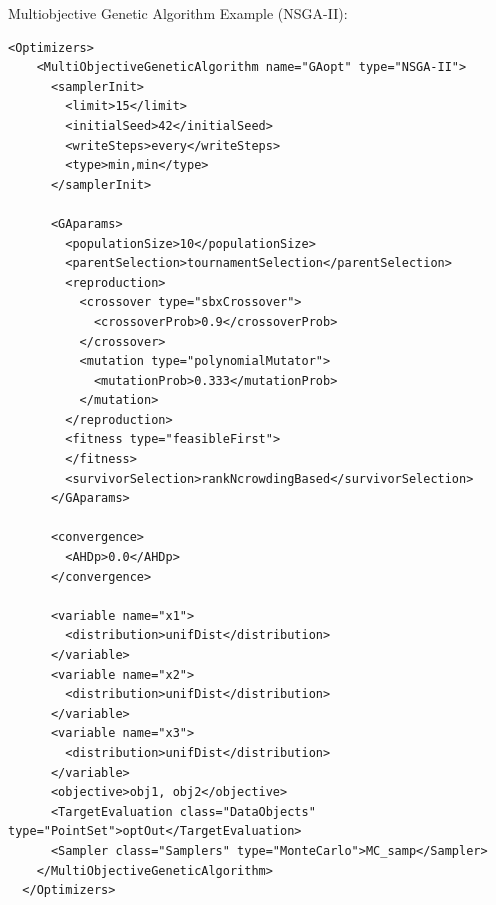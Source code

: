 \hspace{24pt}
Multiobjective Genetic Algorithm Example (NSGA-II):
\begin{lstlisting}[style=XML]
  <Optimizers>
    <MultiObjectiveGeneticAlgorithm name="GAopt" type="NSGA-II">
      <samplerInit>
        <limit>15</limit>
        <initialSeed>42</initialSeed>
        <writeSteps>every</writeSteps>
        <type>min,min</type>
      </samplerInit>

      <GAparams>
        <populationSize>10</populationSize>
        <parentSelection>tournamentSelection</parentSelection>
        <reproduction>
          <crossover type="sbxCrossover">
            <crossoverProb>0.9</crossoverProb>
          </crossover>
          <mutation type="polynomialMutator">
            <mutationProb>0.333</mutationProb>
          </mutation>
        </reproduction>
        <fitness type="feasibleFirst">
        </fitness>
        <survivorSelection>rankNcrowdingBased</survivorSelection>
      </GAparams>

      <convergence>
        <AHDp>0.0</AHDp>
      </convergence>

      <variable name="x1">
        <distribution>unifDist</distribution>
      </variable>
      <variable name="x2">
        <distribution>unifDist</distribution>
      </variable>
      <variable name="x3">
        <distribution>unifDist</distribution>
      </variable>
      <objective>obj1, obj2</objective>
      <TargetEvaluation class="DataObjects" type="PointSet">optOut</TargetEvaluation>
      <Sampler class="Samplers" type="MonteCarlo">MC_samp</Sampler>
    </MultiObjectiveGeneticAlgorithm>
  </Optimizers>
\end{lstlisting}


